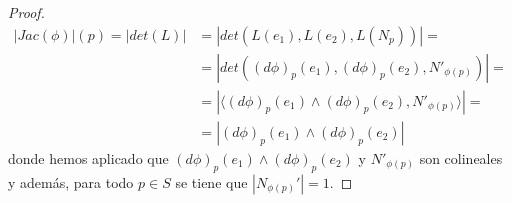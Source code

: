 \begin{teo}
\begin{proof}
        \begin{align*}
            |Jac(\phi)|(p) = 
            |det(L)| &= 
            |det(L(e_1), L(e_2), L(N_p))| = \\
            &=
            |det((d\phi)_p(e_1), (d\phi)_p(e_2), N'_{\phi(p)})| =\\
            &=
            | \langle (d\phi)_p(e_1) \wedge (d\phi)_p(e_2), N'_{\phi(p)} \rangle |=\\
            &=
            |(d\phi)_p(e_1) \wedge (d\phi)_p(e_2)|
        \end{align*}
        donde hemos aplicado que $(d\phi)_p(e_1) \wedge (d\phi)_p(e_2)$ y $N'_{\phi(p)}$ son colineales y además, para todo $p\in S$ se tiene que $|N_{\phi(p)}'|=1$.
    \end{proof}
\end{teo}

